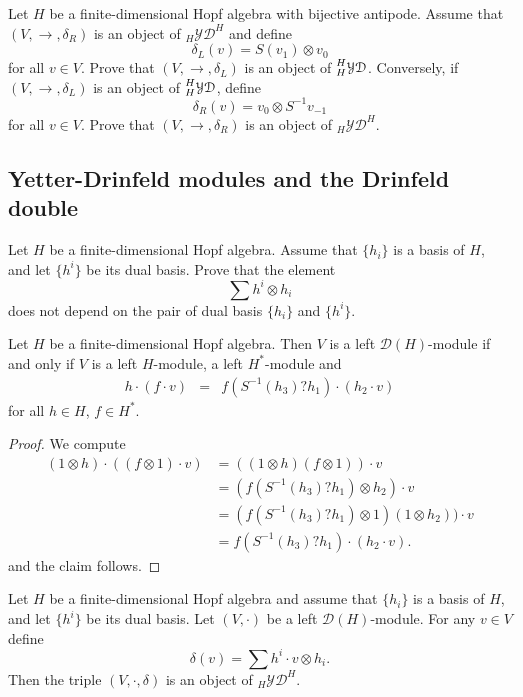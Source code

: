 \begin{exercise}
Let $H$ be a finite-dimensional Hopf algebra with bijective antipode.  Assume that
$(V,\rightarrow,\delta_R)$ is an object of $_{H}\mathcal{YD}^{H}$ and define
\[
\delta_L(v)=S(v_1)\otimes v_0
\]
for all $v\in V$.  Prove that
$(V,\rightarrow,\delta_L)$ is an object of $\prescript{H}{H}{\mathcal{YD}}$. 
Conversely, if $(V,\rightarrow,\delta_L)$ is an object of $\prescript{H}{H}{\mathcal{YD}}$,
define \[
\delta_R(v)=v_0\otimes S^{-1}v_{-1}
\]
for all $v\in V$. Prove that
$(V,\rightarrow,\delta_R)$ is an object of $_H\mathcal{YD}^H$.
\end{exercise}

\subsection{Yetter-Drinfeld modules and the Drinfeld double}

\begin{exercise}
Let $H$ be a finite-dimensional Hopf algebra. Assume that $\{h_i\}$ is a basis
of $H$, and let $\{h^i\}$ be its dual basis.  Prove that the element
\[
\sum h^i\otimes h_i
\]
does not depend on the pair of dual basis $\{h_i\}$ and $\{h^i\}$.
\end{exercise}

\begin{lemma}
\label{lem:DH_compatibility}
Let $H$ be a finite-dimensional Hopf algebra. Then  $V$ is a left
$\mathcal{D}(H)$-module if and only if $V$ is a left $H$-module, a left
$H^{*}$-module and 
\begin{eqnarray}
h\cdot(f\cdot v) & = & f(S^{-1}(h_{3})?h_{1})\cdot(h_{2}\cdot v)\label{eq:compatibility_D(H)}
\end{eqnarray}
for all $h\in H$, $f\in H^{*}$.
\end{lemma}

\begin{proof}
We compute 
\begin{align*}
(1\otimes h)\cdot((f\otimes1)\cdot v) & =((1\otimes h)(f\otimes1))\cdot v\\
 & =(f(S^{-1}(h_{3})?h_{1})\otimes h_{2})\cdot v\\
 & =(f(S^{-1}(h_{3})?h_{1})\otimes1)(1\otimes h_{2}))\cdot v\\
 & =f(S^{-1}(h_{3})?h_{1})\cdot(h_{2}\cdot v).
\end{align*}
and the claim follows. 
\end{proof}

\begin{lemma}
\label{lem:DH_to_YD}
Let $H$ be a finite-dimensional Hopf algebra and assume that $\{h_i\}$ is a basis
of $H$, and let $\{h^i\}$ be its dual basis.  
Let $(V,\cdot)$ be a left $\mathcal{D}(H)$-module. For any $v\in V$ define 
\[
\delta(v)=\sum h^i\cdot v\otimes h_i.
\]
Then the triple $(V,\cdot,\delta)$ is an object of $_H\mathcal{YD}^H$.
\end{lemma}

